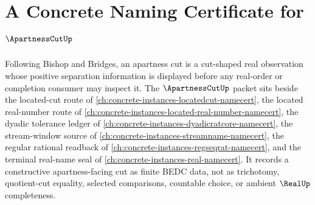\chapter{A Concrete Naming Certificate for $\ApartnessCutUp$}
\label{ch:concrete-instances-apartness-cut-namecert}

Following Bishop and Bridges, an apartness cut is a cut-shaped real observation whose positive separation information is displayed before any real-order or completion consumer may inspect it. The $\ApartnessCutUp$ packet sits beside the located-cut route of \autoref{ch:concrete-instances-locatedcut-namecert}, the located real-number route of \autoref{ch:concrete-instances-located-real-number-namecert}, the dyadic tolerance ledger of \autoref{ch:concrete-instances-dyadicratcore-namecert}, the stream-window source of \autoref{ch:concrete-instances-streamname-namecert}, the regular rational readback of \autoref{ch:concrete-instances-regseqrat-namecert}, and the terminal real-name seal of \autoref{ch:concrete-instances-real-namecert}. It records a constructive apartness-facing cut as finite BEDC data, not as trichotomy, quotient-cut equality, selected comparisons, countable choice, or ambient $\RealUp$ completeness.

